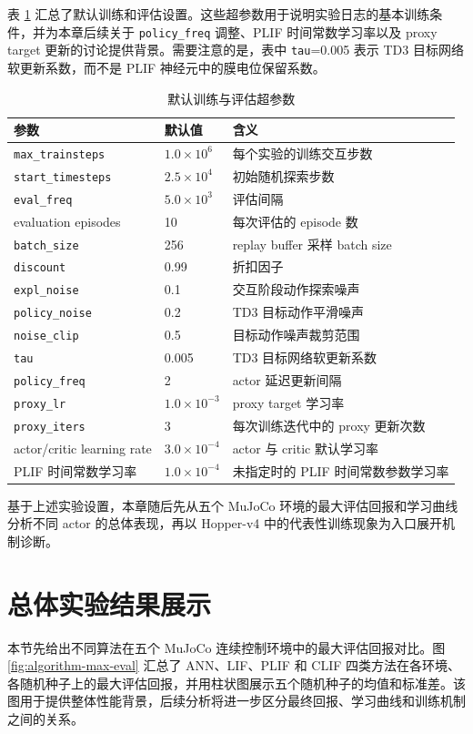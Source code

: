 \documentclass[UTF8,zihao=-4,oneside,openany]{ctexbook}
\begin{document}
表 \ref{tab:hyperparams} 汇总了默认训练和评估设置。这些超参数用于说明实验日志的基本训练条件，并为本章后续关于 \texttt{policy\_freq} 调整、PLIF 时间常数学习率以及 proxy target 更新的讨论提供背景。需要注意的是，表中 \texttt{tau}=0.005 表示 TD3 目标网络软更新系数，而不是 PLIF 神经元中的膜电位保留系数。

\begin{table}[H]
\centering
\caption{默认训练与评估超参数}
\label{tab:hyperparams}
\begin{tabular}{lll}
\toprule
\textbf{参数} & \textbf{默认值} & \textbf{含义} \\
\midrule
\texttt{max\_trainsteps} & $1.0\times10^6$ & 每个实验的训练交互步数 \\
\texttt{start\_timesteps} & $2.5\times10^4$ & 初始随机探索步数 \\
\texttt{eval\_freq} & $5.0\times10^3$ & 评估间隔 \\
evaluation episodes & 10 & 每次评估的 episode 数 \\
\texttt{batch\_size} & 256 & replay buffer 采样 batch size \\
\texttt{discount} & 0.99 & 折扣因子 \\
\texttt{expl\_noise} & 0.1 & 交互阶段动作探索噪声 \\
\texttt{policy\_noise} & 0.2 & TD3 目标动作平滑噪声 \\
\texttt{noise\_clip} & 0.5 & 目标动作噪声裁剪范围 \\
\texttt{tau} & 0.005 & TD3 目标网络软更新系数 \\
\texttt{policy\_freq} & 2 & actor 延迟更新间隔 \\
\texttt{proxy\_lr} & $1.0\times10^{-3}$ & proxy target 学习率 \\
\texttt{proxy\_iters} & 3 & 每次训练迭代中的 proxy 更新次数 \\
actor/critic learning rate & $3.0\times10^{-4}$ & actor 与 critic 默认学习率 \\
PLIF 时间常数学习率 & $1.0\times10^{-4}$ & 未指定时的 PLIF 时间常数参数学习率 \\
\bottomrule
\end{tabular}
\end{table}
\FloatBarrier

基于上述实验设置，本章随后先从五个 MuJoCo 环境的最大评估回报和学习曲线分析不同 actor 的总体表现，再以 Hopper-v4 中的代表性训练现象为入口展开机制诊断。

\section{总体实验结果展示}
本节先给出不同算法在五个 MuJoCo 连续控制环境中的最大评估回报对比。图 \ref{fig:algorithm-max-eval} 汇总了 ANN、LIF、PLIF 和 CLIF 四类方法在各环境、各随机种子上的最大评估回报，并用柱状图展示五个随机种子的均值和标准差。该图用于提供整体性能背景，后续分析将进一步区分最终回报、学习曲线和训练机制之间的关系。
\end{document}
